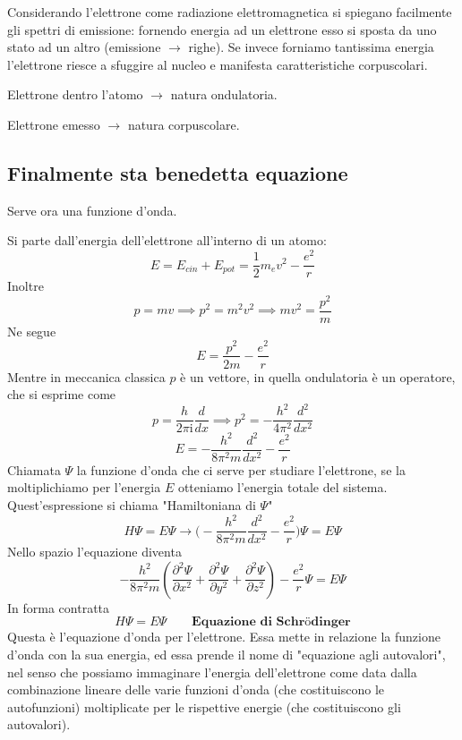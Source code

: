 Considerando l'elettrone come radiazione elettromagnetica si spiegano facilmente gli spettri di emissione: fornendo energia ad un elettrone esso si sposta da uno stato ad un altro (emissione $\rightarrow$ righe). Se invece forniamo tantissima energia l'elettrone riesce a sfuggire al nucleo e manifesta caratteristiche corpuscolari.

\vspace{0.2cm}Elettrone dentro l'atomo $\rightarrow$ natura ondulatoria.

\vspace{0.2cm}Elettrone emesso $\rightarrow$ natura corpuscolare.
\subsection{Finalmente sta benedetta equazione}
Serve ora una funzione d'onda.

Si parte dall'energia dell'elettrone all'interno di un atomo:
$$E=E_{cin} + E_{pot}=\frac{1}{2}m_ev^2 - \frac{e^2}{r}$$
Inoltre
$$p=mv \implies p^2=m^2v^2 \implies mv^2=\frac{p^2}{m}$$
Ne segue
$$E=\frac{p^2}{2m} - \frac{e^2}{r}$$
Mentre in meccanica classica $p$ è un vettore, in quella ondulatoria è un operatore, che si esprime come
$$p=\frac{h}{2\pi \text{i}}\frac{d}{dx}\implies p^2=-\frac{h^2}{4\pi^2}\frac{d^2}{dx^2}$$
$$E=-\frac{h^2}{8\pi^2m}\frac{d^2}{dx^2} -\frac{e^2}{r}$$
Chiamata $\Psi$ la funzione d'onda che ci serve per studiare l'elettrone, se la moltiplichiamo per l'energia $E$ otteniamo l'energia totale del sistema. Quest'espressione si chiama "Hamiltoniana di $\Psi$"
$$H\Psi=E\Psi \rightarrow \biggl(-\frac{h^2}{8\pi^2m}\frac{d^2}{dx^2} -\frac{e^2}{r}\biggr)\Psi=E\Psi$$
Nello spazio l'equazione diventa
$$-\frac{h^2}{8\pi^2m}\left( \frac{\partial^2\Psi}{\partial x^2}+\frac{\partial^2\Psi}{\partial y^2}+\frac{\partial^2\Psi}{\partial z^2}\right) -\frac{e^2}{r}\Psi =E\Psi$$
In forma contratta
$$H\Psi=E\Psi \qquad \textbf{Equazione di Schrödinger}$$
Questa è l'equazione d'onda per l'elettrone. Essa mette in relazione la funzione d'onda con la sua energia, ed essa prende il nome di "equazione agli autovalori", nel senso che possiamo immaginare l'energia dell'elettrone come data dalla combinazione lineare delle varie funzioni d'onda (che costituiscono le autofunzioni) moltiplicate per le rispettive energie (che costituiscono gli autovalori).


